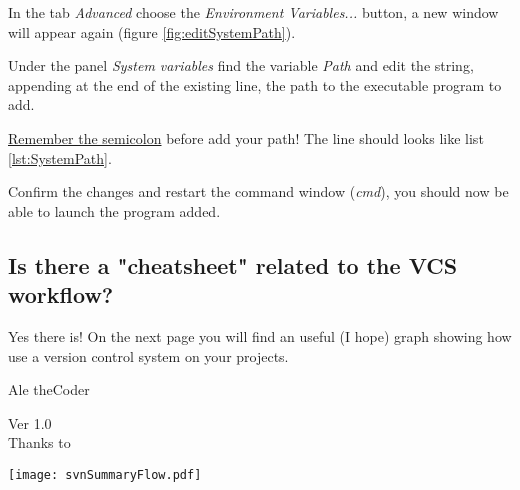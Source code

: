 In the tab \textit{Advanced} choose the \textit{Environment Variables...} button, a new window will appear again (figure \ref{fig:editSystemPath}).

Under the panel \textit{System variables} find the variable \textit{Path} and edit the string, appending at the end of the existing line, the path to the executable program to add. 

\underline{Remember the semicolon} before add your path! The line should looks like list \ref{lst:SystemPath}.



Confirm the changes and restart the command window (\textit{cmd}), you should now be able to launch the program added.




\subsection{Is there a "cheatsheet" related to the VCS workflow?}
\label{subsection:cheatsheet}

Yes there is! On the next page you will find an useful (I hope) graph showing how use a version control system on your projects.\newline

Ale theCoder


Ver 1.0\ \\


Thanks to \LaTeXe


\newpage


\begin{landscape}
\thispagestyle{empty}
    \centering
    \texttt{[image: svnSummaryFlow.pdf]}
\end{landscape}








